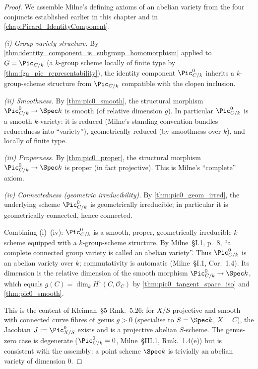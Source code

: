 \begin{proof}\leanok
  We assemble Milne's defining axioms of an abelian variety from the
  four conjuncts established earlier in this chapter and in
  \cref{chap:Picard_IdentityComponent}.

  \emph{(i) Group-variety structure.} By
  \cref{thm:identity_component_is_subgroup_homomorphism} applied to
  \(G = \Pic_{C/k}\) (a \(k\)-group scheme locally of finite type by
  \cref{thm:fga_pic_representability}), the identity component
  \(\Pic^0_{C/k}\) inherits a \(k\)-group-scheme structure from
  \(\Pic_{C/k}\) compatible with the clopen inclusion.

  \emph{(ii) Smoothness.} By \cref{thm:pic0_smooth}, the structural
  morphism \(\Pic^0_{C/k} \to \Spec k\) is smooth (of relative
  dimension \(g\)). In particular \(\Pic^0_{C/k}\) is a smooth
  \(k\)-variety: it is reduced (Milne's standing convention bundles
  reducedness into ``variety''), geometrically reduced (by
  smoothness over \(k\)), and locally of finite type.

  \emph{(iii) Properness.} By \cref{thm:pic0_proper}, the structural
  morphism \(\Pic^0_{C/k} \to \Spec k\) is proper (in fact
  projective). This is Milne's ``complete'' axiom.

  \emph{(iv) Connectedness (geometric irreducibility).} By
  \cref{thm:pic0_geom_irred}, the underlying scheme
  \(\Pic^0_{C/k}\) is geometrically irreducible; in particular it is
  geometrically connected, hence connected.

  Combining (i)--(iv): \(\Pic^0_{C/k}\) is a smooth, proper,
  geometrically irreducible \(k\)-scheme equipped with a
  \(k\)-group-scheme structure. By Milne~\S I.1, p.~8, ``a complete
  connected group variety is called an abelian variety''. Thus
  \(\Pic^0_{C/k}\) is an abelian variety over \(k\); commutativity is
  automatic (Milne~\S I.1, Cor.~1.4). Its dimension is the relative
  dimension of the smooth morphism \(\Pic^0_{C/k} \to \Spec k\),
  which equals \(g(C) = \dim_k H^1(C, \mathcal{O}_C)\) by
  \cref{thm:pic0_tangent_space_iso} and \cref{thm:pic0_smooth}.

  This is the content of Kleiman~\S 5 Rmk.~5.26: for \(X/S\)
  projective and smooth with connected curve fibres of genus
  \(g > 0\) (specialise to \(S = \Spec k\), \(X = C\)), the Jacobian
  \(J := \Pic^0_{X/S}\) exists and is a projective abelian
  \(S\)-scheme. The genus-zero case is degenerate
  (\(\Pic^0_{C/k} = 0\), Milne~\S III.1, Rmk.~1.4(e)) but is
  consistent with the assembly: a point scheme \(\Spec k\) is
  trivially an abelian variety of dimension \(0\).
\end{proof}

